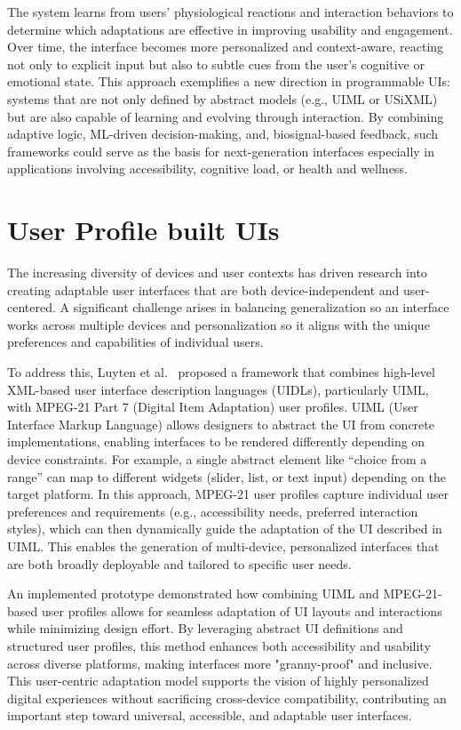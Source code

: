 \documentclass[openany]{book}
\begin{document}
The system learns from users' physiological reactions and interaction behaviors to determine which adaptations are effective in improving usability and engagement. Over time, the interface becomes more personalized and context-aware, reacting not only to explicit input but also to subtle cues from the user’s cognitive or emotional state.
This approach exemplifies a new direction in programmable UIs: systems that are not only defined by abstract models (e.g., UIML or USiXML) but are also capable of learning and evolving through interaction. By combining adaptive logic, ML-driven decision-making, and, biosignal-based feedback, such frameworks could serve as the basis for next-generation interfaces especially in applications involving accessibility, cognitive load, or health and wellness.


\section{User Profile built UIs}
The increasing diversity of devices and user contexts has driven research into creating adaptable user interfaces that are both device-independent and user-centered. A significant challenge arises in balancing generalization so an interface works across multiple devices and personalization so it aligns with the unique preferences and capabilities of individual users.

To address this, Luyten et al.~\cite{luyten2005profile} proposed a framework that combines high-level XML-based user interface description languages (UIDLs), particularly UIML, with MPEG-21 Part 7 (Digital Item Adaptation) user profiles. UIML (User Interface Markup Language) allows designers to abstract the UI from concrete implementations, enabling interfaces to be rendered differently depending on device constraints. For example, a single abstract element like “choice from a range” can map to different widgets (slider, list, or text input) depending on the target platform. In this approach, MPEG-21 user profiles capture individual user preferences and requirements (e.g., accessibility needs, preferred interaction styles), which can then dynamically guide the adaptation of the UI described in UIML. This enables the generation of multi-device, personalized interfaces that are both broadly deployable and tailored to specific user needs.

An implemented prototype demonstrated how combining UIML and MPEG-21-based user profiles allows for seamless adaptation of UI layouts and interactions while minimizing design effort. By leveraging abstract UI definitions and structured user profiles, this method enhances both accessibility and usability across diverse platforms, making interfaces more "granny-proof" and inclusive. This user-centric adaptation model supports the vision of highly personalized digital experiences without sacrificing cross-device compatibility, contributing an important step toward universal, accessible, and adaptable user interfaces.
\end{document}
